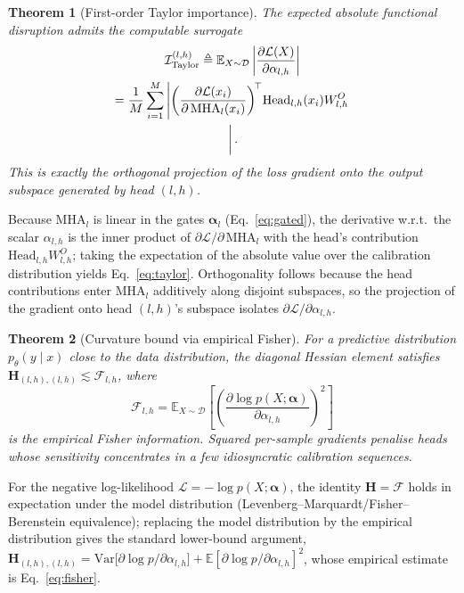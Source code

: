 \documentclass[10pt,journal,compsoc]{IEEEtran}
\newtheorem{theorem}{Theorem}
\begin{document}
\begin{theorem}[First-order Taylor importance]
\label{thm:taylor}
The expected absolute functional disruption admits the computable surrogate
\begin{multline}\mathcal{I}^{(l,h)}_{\mathrm{Taylor}}
\triangleq\mathbb{E}_{X\sim\mathcal{D}}\left|\frac{\partial\mathcal{L}(X)}{\partial\alpha_{l,h}}\right|
\\=\frac{1}{M}\sum_{i=1}^{M}\left|\left(\frac{\partial\mathcal{L}(x_i)}{\partial\,\mathrm{MHA}_l(x_i)}\right)^{\!\top}\!\mathrm{Head}_{l,h}(x_i)W^{O}_{l,h}\right.\\\left.\vphantom{\frac{\partial\mathcal{L}}{\partial\alpha_{l,h}}}\right|.\label{eq:taylor}\end{multline}
This is exactly the orthogonal projection of the loss gradient onto the output
subspace generated by head $(l,h)$.
\end{theorem}
\begin{IEEEproof}
Because $\mathrm{MHA}_l$ is linear in the gates $\boldsymbol{\alpha}_l$
(Eq.~\ref{eq:gated}), the derivative w.r.t.\ the scalar $\alpha_{l,h}$ is the
inner product of $\partial\mathcal{L}/\partial\,\mathrm{MHA}_l$ with the head's
contribution $\mathrm{Head}_{l,h}W^{O}_{l,h}$; taking the expectation of the
absolute value over the calibration distribution yields Eq.~\ref{eq:taylor}.
Orthogonality follows because the head contributions enter
$\mathrm{MHA}_l$ additively along disjoint subspaces, so the projection of the
gradient onto head $(l,h)$'s subspace isolates $\partial\mathcal{L}/\partial\alpha_{l,h}$.
\end{IEEEproof}

\begin{theorem}[Curvature bound via empirical Fisher]
\label{thm:fisher}
For a predictive distribution $p_\theta(y\mid x)$ close to the data
distribution, the diagonal Hessian element satisfies
$\mathbf{H}_{(l,h),(l,h)}\lesssim\mathcal{F}_{l,h}$, where
\begin{equation}
\mathcal{F}_{l,h}=\mathbb{E}_{X\sim\mathcal{D}}\left[\left(\frac{\partial\log p(X;\boldsymbol{\alpha})}{\partial\alpha_{l,h}}\right)^{2}\right]
\label{eq:fisher}
\end{equation}
is the empirical Fisher information. Squared per-sample gradients penalise heads
whose sensitivity concentrates in a few idiosyncratic calibration sequences.
\end{theorem}
\begin{IEEEproof}
For the negative log-likelihood $\mathcal{L}=-\log p(X;\boldsymbol{\alpha})$, the
identity $\mathbf{H}=\mathcal{F}$ holds in expectation under the model
distribution (Levenberg--Marquardt/Fisher--Berenstein equivalence); replacing the
model distribution by the empirical distribution gives the standard lower-bound
argument, $\mathbf{H}_{(l,h),(l,h)}=\mathrm{Var}\big[\partial\log p/\partial\alpha_{l,h}\big]+\mathbb{E}[\partial\log p/\partial\alpha_{l,h}]^{2}$,
whose empirical estimate is Eq.~\ref{eq:fisher}.
\end{IEEEproof}
\end{document}

